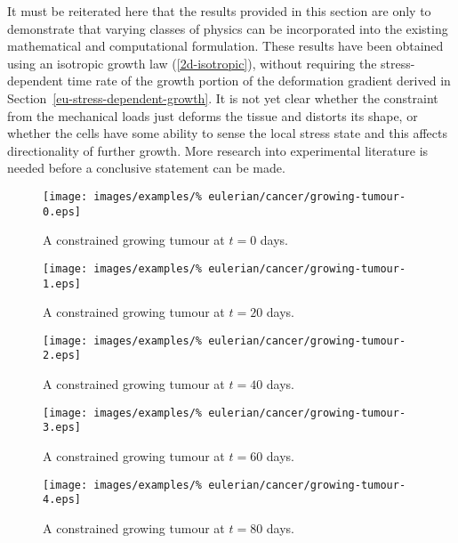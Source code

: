 \vspace{1 cm} %

It must be reiterated here that the results provided in this section
are only to demonstrate that varying classes of physics can be
incorporated into the existing mathematical and computational
formulation. These results have been obtained using an isotropic
growth law (\ref{2d-isotropic}), without requiring the
stress-dependent time rate of the growth portion of the deformation
gradient derived in Section~\ref{eu-stress-dependent-growth}. It is
not yet clear whether the constraint from the mechanical loads just
deforms the tissue and distorts its shape, or whether the cells have
some ability to sense the local stress state and this affects
directionality of further growth. More research into experimental
literature is needed before a conclusive statement can be made.

\vspace{1cm} %

\begin{figure}[!hptb]
\centering
\texttt{[image: images/examples/\%
eulerian/cancer/growing-tumour-0.eps]}
\caption{A constrained growing tumour at $t=0$ days.}
\label{tumour-growth-constrained-0}
\end{figure}

\begin{figure}[!hptb]
\centering
\texttt{[image: images/examples/\%
eulerian/cancer/growing-tumour-1.eps]}
\caption{A constrained growing tumour at $t=20$ days.}
\label{tumour-growth-constrained-1}
\end{figure}

\begin{figure}[!hptb]
\centering
\texttt{[image: images/examples/\%
eulerian/cancer/growing-tumour-2.eps]}
\caption{A constrained growing tumour at $t=40$ days.}
\label{tumour-growth-constrained-2}
\end{figure}

\begin{figure}[!hptb]
\centering
\texttt{[image: images/examples/\%
eulerian/cancer/growing-tumour-3.eps]}
\caption{A constrained growing tumour at $t=60$ days.}
\label{tumour-growth-constrained-3}
\end{figure}

\begin{figure}[!hptb]
\centering
\texttt{[image: images/examples/\%
eulerian/cancer/growing-tumour-4.eps]}
\caption{A constrained growing tumour at $t=80$ days.}
\label{tumour-growth-constrained-4}
\end{figure}

